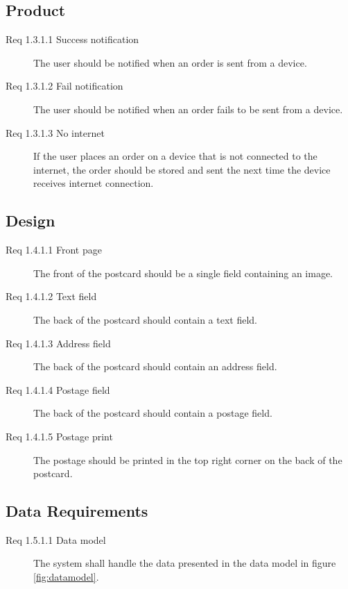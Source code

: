 \documentclass[10pt,a4paper]{article}
\begin{document}
\subsection{Product}
\begin{description}
\item [Req 1.3.1.1 Success notification]The user should be notified when an order is sent from a device.
\item [Req 1.3.1.2 Fail notification] The user should be notified when an order fails to be sent from a device.

\item [Req 1.3.1.3 No internet] If the user places an order on a device that is not connected to the internet, the order should be stored and sent the next time the device receives internet connection. 

\end{description}


\subsection{Design}
\begin {description}
\item[Req 1.4.1.1 Front page] The front of the postcard should be a single field containing an image.
\item [Req 1.4.1.2 Text field] The back of the postcard should contain a text field.
\item [Req 1.4.1.3 Address field] The back of the postcard should contain an address field.
\item [Req 1.4.1.4 Postage field] The back of the postcard should contain a postage field. 
\item [Req 1.4.1.5 Postage print] The postage should be printed in the top right corner on the back of the postcard. 
\end{description}
\subsection{Data Requirements}
\begin {description}

\item[Req 1.5.1.1 Data model] The system shall handle the data presented in the data model in figure \ref{fig:datamodel}.
\end{description}
\end{document}
